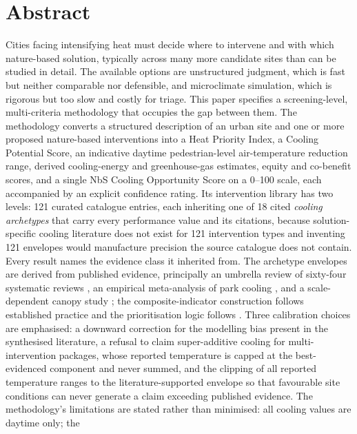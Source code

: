 \section*{Abstract}

Cities facing intensifying heat must decide where to intervene and with which
nature-based solution, typically across many more candidate sites than can be
studied in detail. The available options are unstructured judgment, which is
fast but neither comparable nor defensible, and microclimate simulation, which
is rigorous but too slow and costly for triage. This paper specifies a
screening-level, multi-criteria methodology that occupies the gap between them.
The methodology converts a structured description of an urban site and one or
more proposed nature-based interventions into a Heat Priority Index, a Cooling
Potential Score, an indicative daytime pedestrian-level air-temperature
reduction range, derived cooling-energy and greenhouse-gas estimates, equity
and co-benefit scores, and a single NbS Cooling Opportunity Score on a
\numrange{0}{100} scale, each accompanied by an explicit confidence rating. Its
intervention library has two levels: \num{121} curated catalogue entries, each
inheriting one of \num{18} cited \emph{cooling archetypes} that carry every
performance value and its citations, because solution-specific cooling
literature does not exist for \num{121} intervention types and inventing
\num{121} envelopes would manufacture precision the source catalogue does not
contain. Every result names the evidence class it inherited from. The archetype
envelopes are derived from published evidence, principally an umbrella review
of sixty-four systematic reviews \parencite{keravec2026}, an empirical
meta-analysis of park cooling \parencite{bowler2010}, and a scale-dependent
canopy study \parencite{ziter2019}; the composite-indicator construction
follows established practice \parencite{nardo2008} and the prioritisation logic
follows \textcite{norton2015}. Three calibration choices are emphasised: a
downward correction for the modelling bias present in the synthesised
literature, a refusal to claim super-additive cooling for multi-intervention
packages, whose reported temperature is capped at the best-evidenced component
and never summed, and the clipping of all reported temperature ranges to
the literature-supported envelope so that favourable site conditions can never
generate a claim exceeding published evidence. The methodology's limitations
are stated rather than minimised: all cooling values are daytime only; the
